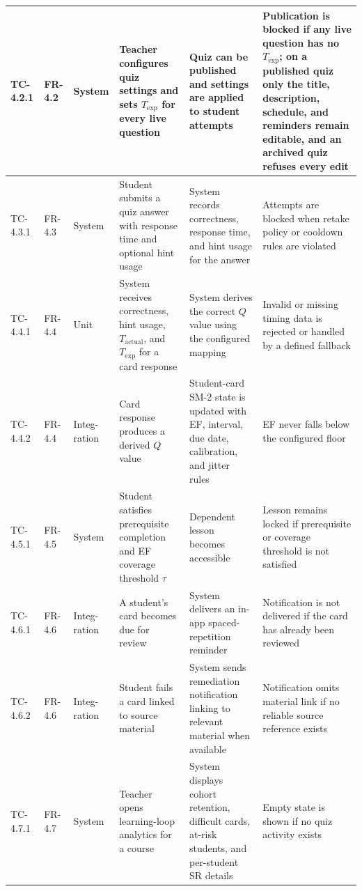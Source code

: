 \begin{longtable}{|>{\centering\arraybackslash}m{}|>{\centering\arraybackslash}m{}|>{\centering\arraybackslash}m{}|m{}|m{}|m{}|}
TC-4.2.1 & FR-4.2 & System & Teacher configures quiz settings and sets $T_{\text{exp}}$ for every live question & Quiz can be published and settings are applied to student attempts & Publication is blocked if any live question has no $T_{\text{exp}}$; on a published quiz only the title, description, schedule, and reminders remain editable, and an archived quiz refuses every edit \\ \hline

TC-4.3.1 & FR-4.3 & System & Student submits a quiz answer with response time and optional hint usage & System records correctness, response time, and hint usage for the answer & Attempts are blocked when retake policy or cooldown rules are violated \\ \hline

TC-4.4.1 & FR-4.4 & Unit & System receives correctness, hint usage, $T_{\text{actual}}$, and $T_{\text{exp}}$ for a card response & System derives the correct $Q$ value using the configured mapping & Invalid or missing timing data is rejected or handled by a defined fallback \\ \hline
TC-4.4.2 & FR-4.4 & Integ-ration & Card response produces a derived $Q$ value & Student-card SM-2 state is updated with EF, interval, due date, calibration, and jitter rules & EF never falls below the configured floor \\ \hline

TC-4.5.1 & FR-4.5 & System & Student satisfies prerequisite completion and EF coverage threshold $\tau$ & Dependent lesson becomes accessible & Lesson remains locked if prerequisite or coverage threshold is not satisfied \\ \hline

TC-4.6.1 & FR-4.6 & Integ-ration & A student's card becomes due for review & System delivers an in-app spaced-repetition reminder & Notification is not delivered if the card has already been reviewed \\ \hline
TC-4.6.2 & FR-4.6 & Integ-ration & Student fails a card linked to source material & System sends remediation notification linking to relevant material when available & Notification omits material link if no reliable source reference exists \\ \hline

TC-4.7.1 & FR-4.7 & System & Teacher opens learning-loop analytics for a course & System displays cohort retention, difficult cards, at-risk students, and per-student SR details & Empty state is shown if no quiz activity exists \\ \hline


\end{longtable}
